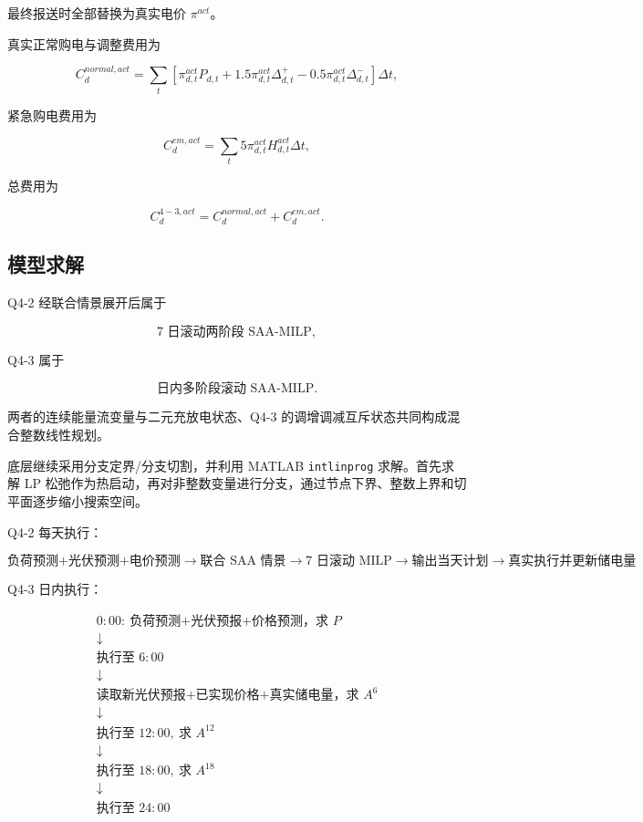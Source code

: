 最终报送时全部替换为真实电价 \(\pi^{act}\)。

真实正常购电与调整费用为

\begin{equation}
C_d^{normal,act}
=
\sum_t
\left[
\pi_{d,t}^{act}P_{d,t}
+
1.5\pi_{d,t}^{act}\Delta^+_{d,t}
-
0.5\pi_{d,t}^{act}\Delta^-_{d,t}
\right]\Delta t,
\end{equation}

紧急购电费用为

\begin{equation}
C_d^{em,act}
=
\sum_t
5\pi_{d,t}^{act}
H_{d,t}^{act}\Delta t,
\end{equation}

总费用为

\begin{equation}
C_d^{4-3,act}
=
C_d^{normal,act}
+
C_d^{em,act}.
\end{equation}

\subsection{模型求解}

Q4-2 经联合情景展开后属于

\[
\boxed{\text{7 日滚动两阶段 SAA-MILP}},
\]

Q4-3 属于

\[
\boxed{\text{日内多阶段滚动 SAA-MILP}}.
\]

两者的连续能量流变量与二元充放电状态、Q4-3 的调增调减互斥状态共同构成混合整数线性规划。

底层继续采用分支定界/分支切割，并利用 MATLAB \texttt{intlinprog} 求解。首先求解 LP 松弛作为热启动，再对非整数变量进行分支，通过节点下界、整数上界和切平面逐步缩小搜索空间。

Q4-2 每天执行：

\[
\boxed{
\text{负荷预测+光伏预测+电价预测}
\rightarrow
\text{联合 SAA 情景}
\rightarrow
\text{7 日滚动 MILP}
\rightarrow
\text{输出当天计划}
\rightarrow
\text{真实执行并更新储电量}
}
\]

Q4-3 日内执行：

\[
\boxed{
\begin{array}{c}
0{:}00:\ \text{负荷预测+光伏预报+价格预测，求 }P\\
\downarrow\\
\text{执行至 }6{:}00\\
\downarrow\\
\text{读取新光伏预报+已实现价格+真实储电量，求 }A^6\\
\downarrow\\
\text{执行至 }12{:}00,\ \text{求 }A^{12}\\
\downarrow\\
\text{执行至 }18{:}00,\ \text{求 }A^{18}\\
\downarrow\\
\text{执行至 }24{:}00
\end{array}
}
\]

